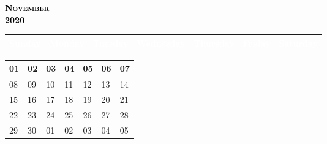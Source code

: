\documentclass{article}
\newcommand{\daysize}{2.5cm}		%
\newcommand{\dw}{3.5cm}					%
\newcommand{\mkday}[1]{
  #1
  \vspace{\daysize}
}
\begin{document}
		\begin{center}
			\textsc{\LARGE \textbf{\textcolor{black}{
			November
			}}}\\ %
			\textsc{\large \textbf{\textcolor{black}{
			2020
			}}} %
		\end{center}

		\begin{center}
		\begin{tabular}{| p{\dw} | p{\dw} | p{\dw} | p{\dw} | p{\dw} | p{\dw} | p{\dw} |}
			\hline
			\cellcolor{bannercolor} \textcolor{white}{Sunday} &
			\cellcolor{bannercolor} \textcolor{white}{Monday} &
			\cellcolor{bannercolor} \textcolor{white}{Tuesday} &
			\cellcolor{bannercolor} \textcolor{white}{Wednesday} &
			\cellcolor{bannercolor} \textcolor{white}{Thursday} &
			\cellcolor{bannercolor} \textcolor{white}{Friday} &
			\cellcolor{bannercolor} \textcolor{white}{Saturday} \\
			\hline
		\end{tabular}

		\vspace{0.1cm}

		\begin{tabular}{| p{\dw} | p{\dw} | p{\dw} | p{\dw} | p{\dw} | p{\dw} | p{\dw} |}
\hline 
\cellcolor{weekendcolor}\mkday{
    01
} & 
\mkday{
    02
} &
\mkday{
    03
} &
\mkday{
    04
} &
\mkday{
    05
} &
\mkday{
    06
} &
\cellcolor{weekendcolor}\mkday{
    07
} 
\\
\hline 
\cellcolor{weekendcolor}\mkday{
    08
} & 
\mkday{
    09
} &
\mkday{
    10
} &
\mkday{
    11
} &
\mkday{
    12
} &
\mkday{
    13
} &
\cellcolor{weekendcolor}\mkday{
    14
} 
\\
\hline 
\cellcolor{weekendcolor}\mkday{
    15
} & 
\mkday{
    16
} &
\mkday{
    17
} &
\mkday{
    18
} &
\mkday{
    19
} &
\mkday{
    20
} &
\cellcolor{weekendcolor}\mkday{
    21
} 
\\
\hline 
\cellcolor{weekendcolor}\mkday{
    22
} & 
\mkday{
    23
} &
\mkday{
    24
} &
\mkday{
    25
} &
\mkday{
    26
} &
\mkday{
    27
} &
\cellcolor{weekendcolor}\mkday{
    28
} 
\\
\hline 
\cellcolor{weekendcolor}\mkday{
    29
} & 
\mkday{
    30
} &
\mkday{
    01
} &
\mkday{
    02
} &
\mkday{
    03
} &
\mkday{
    04
} &
\cellcolor{weekendcolor}\mkday{
    05
} 
\\
		\end{tabular}

		\end{center}
\end{document}
